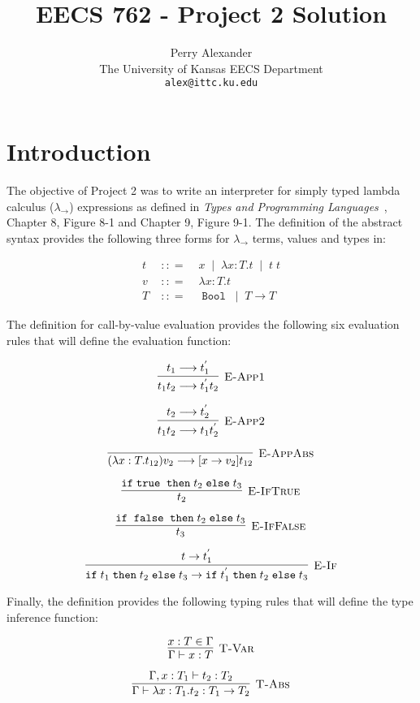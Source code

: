 \documentclass[10pt]{article}
\title{EECS 762 - Project 2 Solution}
\author{Perry Alexander \\
  The University of Kansas EECS Department\\
  \texttt{alex@ittc.ku.edu}}
\newcommand{\isa}{\ensuremath{\; {:}{:}{=} \;}}
\newcommand{\ora}{\ensuremath{\;\mid\;}}
\newcommand{\IF}{\ensuremath{\mathtt{ if \;}}}
\newcommand{\THEN}{\ensuremath{\mathtt{\; then \;}}}
\newcommand{\ELSE}{\ensuremath{\mathtt{\; else \;}}}
\newcommand{\TRUE}{\ensuremath{\mathtt{ true \;}}}
\newcommand{\FALSE}{\ensuremath{\mathtt{\; false \;}}}
\newcommand{\BOOL}{\ensuremath{\mathtt{\; Bool \;}}}
\begin{document}
\maketitle

\section{Introduction}

The objective of Project 2 was to write an interpreter for simply
typed lambda calculus ($\lambda_\rightarrow$) expressions as defined
in \emph{Types and Programming Languages}~\cite{Pie00}, Chapter 8,
Figure 8-1 and Chapter 9, Figure 9-1.  The definition of the abstract
syntax provides the following three forms for $\lambda_\rightarrow$
terms, values and types in:

\begin{eqnarray*}
  t & \isa & x \ora \lambda x:T.t \ora t\; t \\
  v & \isa & \lambda x:T.t \\
  T & \isa & \BOOL \ora T \rightarrow T
\end{eqnarray*}

The definition for call-by-value evaluation provides the following
six evaluation rules that will define the evaluation function:

\[\vcenter{\infer[\textsc{E-App1}]{t_1 t_2 \longrightarrow t_1^{'} t_2}{t_1\longrightarrow t_1^{'}}}\]

\[\vcenter{\infer[\textsc{E-App2}]{t_1 t_2 \longrightarrow t_1 t_2^{'}}{t_2\longrightarrow t_2^{'}}}\]

\[\vcenter{\infer[\textsc{E-AppAbs}]{(\lambda x:T.t_{12})v_2 \longrightarrow [x\rightarrow v_2]t_{12}}{}}\]

\[\vcenter{\infer[\textsc{E-IfTrue}]{t_2}{\IF \TRUE \THEN t_2 \ELSE t_3}}\]

\[\vcenter{\infer[\textsc{E-IfFalse}]{t_3}{\IF \FALSE \THEN t_2 \ELSE t_3}}\]

\[\vcenter{\infer[\textsc{E-If}]
  {\IF t_1 \THEN t_2 \ELSE t_3 \rightarrow \IF t_1^{'} \THEN t_2 \ELSE t_3}
  {t\rightarrow t_1^{'}}}
\]

Finally, the definition provides the following typing rules that will
define the type inference function:

\[\vcenter{\infer[\textsc{T-Var}]{\Gamma\vdash x:T}{x:T\in\Gamma}}\]

\[\vcenter{\infer[\textsc{T-Abs}]
  {\Gamma\vdash\lambda x:T_1.t_2 : T_1\rightarrow T_2}
  {\Gamma,x:T_1\vdash t_2 : T_2}}
\]
\end{document}
